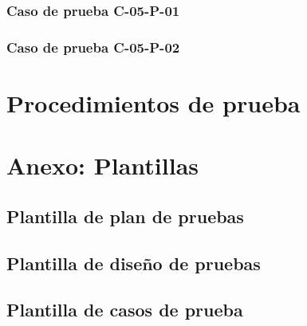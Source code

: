 \documentclass[10pt,a4paper]{article}
\begin{document}
			\subsubsection{Caso de prueba C-05-P-01}

			\subsubsection{Caso de prueba C-05-P-02}

\section{Procedimientos de prueba}

\section{Anexo: Plantillas}
	\subsection{Plantilla de plan de pruebas}

	\subsection{Plantilla de diseño de pruebas}

	\subsection{Plantilla de casos de prueba}

	
\end{document}

